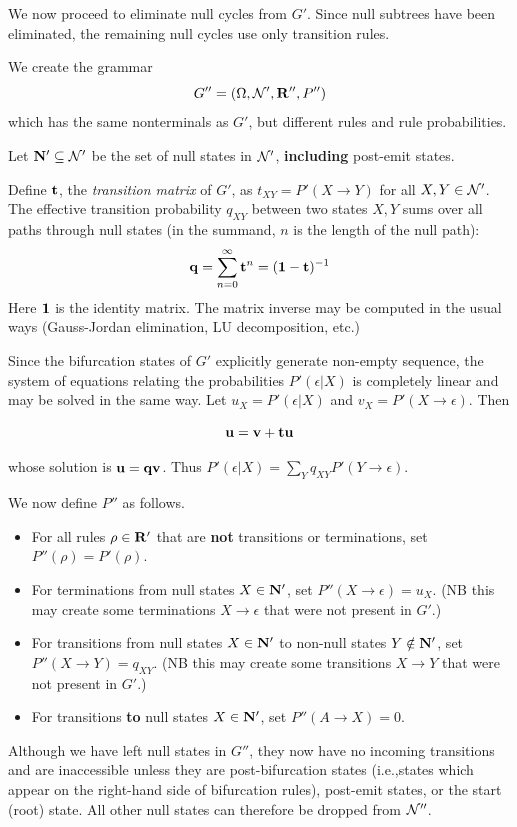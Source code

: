 \documentclass[10pt]{article}
\begin{document}
We now proceed to eliminate null cycles from $G'$.
Since null subtrees have been eliminated, the remaining null cycles use only transition rules.

We create the grammar
\[
G'' = \left( \Omega, {\cal N}', {\bf R}'', P'' \right)
\]
which has the same nonterminals as $G'$, but different rules and rule probabilities.

Let ${\bf N}' \subseteq {\cal N}'$ be the set of null states in ${\cal N}'$, {\bf including} post-emit states.

Define ${\bf t}$, the {\em transition matrix} of $G'$, as $t_{XY} = P'(X \to Y)$ for all $X,Y \in {\cal N}'$.
The effective transition probability $q_{XY}$ between two states $X,Y$
sums over all paths through null states (in the summand, $n$ is the length of the null path):
\[
{\bf q} = \sum_{n=0}^\infty {\bf t}^n = ({\bf 1}-{\bf t})^{-1}
\]
Here ${\bf 1}$ is the identity matrix.
The matrix inverse may be computed in the usual ways (Gauss-Jordan elimination, LU decomposition, etc.)

Since the bifurcation states of $G'$ explicitly generate non-empty sequence,
the system of equations relating the probabilities $P'(\epsilon|X)$ is completely linear
and may be solved in the same way.
Let $u_X = P'(\epsilon|X)$ and $v_X = P'(X \to \epsilon)$.
Then

\[
{\bf u} = {\bf v} + {\bf tu}
\]

whose solution is ${\bf u} = {\bf qv}$.
Thus $P'(\epsilon|X) = \sum_Y q_{XY} P'(Y \to \epsilon)$.

We now define $P''$ as follows.
\begin{itemize}
\item For all rules $\rho \in {\bf R}'$ that are {\bf not} transitions or terminations, set $P''(\rho) = P'(\rho)$.
\item For terminations from null states $X \in {\bf N}'$, set $P''(X \to \epsilon) = u_X$.
(NB this may create some terminations $X \to \epsilon$ that were not present in $G'$.)
\item For transitions from null states $X \in {\bf N}'$ to non-null states $Y \notin {\bf N}'$, set $P''(X \to Y) = q_{XY}$.
(NB this may create some transitions $X \to Y$ that were not present in $G'$.)
\item For transitions {\bf to} null states $X \in {\bf N}'$, set $P''(A \to X) = 0$.
\end{itemize}

Although we have left null states in $G''$, they now have no incoming transitions
and are inaccessible unless they are post-bifurcation states (i.e.,states which appear on the right-hand side of bifurcation rules), post-emit states, or the start (root) state.
All other null states can therefore be dropped from ${\cal N}''$.
\end{document}
